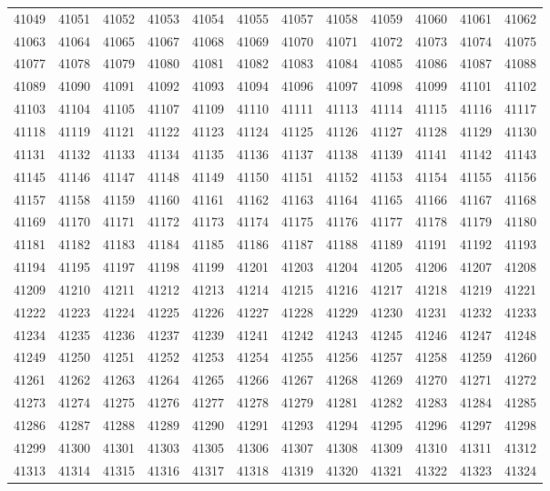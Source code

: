 \begin{center}
\begin{longtable}{llllllllllll}
41049 &41051 &41052 &41053 &41054 &41055 &41057 &41058 &41059 &41060 &41061 &41062 \\
41063 &41064 &41065 &41067 &41068 &41069 &41070 &41071 &41072 &41073 &41074 &41075 \\
41077 &41078 &41079 &41080 &41081 &41082 &41083 &41084 &41085 &41086 &41087 &41088 \\
41089 &41090 &41091 &41092 &41093 &41094 &41096 &41097 &41098 &41099 &41101 &41102 \\
41103 &41104 &41105 &41107 &41109 &41110 &41111 &41113 &41114 &41115 &41116 &41117 \\
41118 &41119 &41121 &41122 &41123 &41124 &41125 &41126 &41127 &41128 &41129 &41130 \\
41131 &41132 &41133 &41134 &41135 &41136 &41137 &41138 &41139 &41141 &41142 &41143 \\
41145 &41146 &41147 &41148 &41149 &41150 &41151 &41152 &41153 &41154 &41155 &41156 \\
41157 &41158 &41159 &41160 &41161 &41162 &41163 &41164 &41165 &41166 &41167 &41168 \\
41169 &41170 &41171 &41172 &41173 &41174 &41175 &41176 &41177 &41178 &41179 &41180 \\
41181 &41182 &41183 &41184 &41185 &41186 &41187 &41188 &41189 &41191 &41192 &41193 \\
41194 &41195 &41197 &41198 &41199 &41201 &41203 &41204 &41205 &41206 &41207 &41208 \\
41209 &41210 &41211 &41212 &41213 &41214 &41215 &41216 &41217 &41218 &41219 &41221 \\
41222 &41223 &41224 &41225 &41226 &41227 &41228 &41229 &41230 &41231 &41232 &41233 \\
41234 &41235 &41236 &41237 &41239 &41241 &41242 &41243 &41245 &41246 &41247 &41248 \\
41249 &41250 &41251 &41252 &41253 &41254 &41255 &41256 &41257 &41258 &41259 &41260 \\
41261 &41262 &41263 &41264 &41265 &41266 &41267 &41268 &41269 &41270 &41271 &41272 \\
41273 &41274 &41275 &41276 &41277 &41278 &41279 &41281 &41282 &41283 &41284 &41285 \\
41286 &41287 &41288 &41289 &41290 &41291 &41293 &41294 &41295 &41296 &41297 &41298 \\
41299 &41300 &41301 &41303 &41305 &41306 &41307 &41308 &41309 &41310 &41311 &41312 \\
41313 &41314 &41315 &41316 &41317 &41318 &41319 &41320 &41321 &41322 &41323 &41324 \\

\end{longtable}
\end{center}
